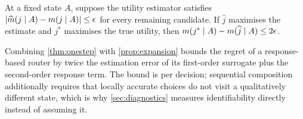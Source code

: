 \begin{theorem}
\label{thm:onestep}
At a fixed state $A$, suppose the utility estimator satisfies
$|\widehat{m}(j\mid A)-m(j\mid A)|\leq\epsilon$ for every
remaining candidate. If $\widehat{j}$ maximises the estimate and $j^*$ maximises
the true utility, then
$m(j^*\mid A)-m(\widehat{j}\mid A)\leq 2\epsilon$.
\end{theorem}

Combining \cref{thm:onestep} with \cref{prop:expansion} bounds the regret of a
response-based router by twice the estimation error of its first-order surrogate
plus the second-order response term. The bound is per decision; sequential
composition additionally requires that locally accurate choices do not visit a
qualitatively different state, which is why \cref{sec:diagnostics} measures
identifiability directly instead of assuming it.

